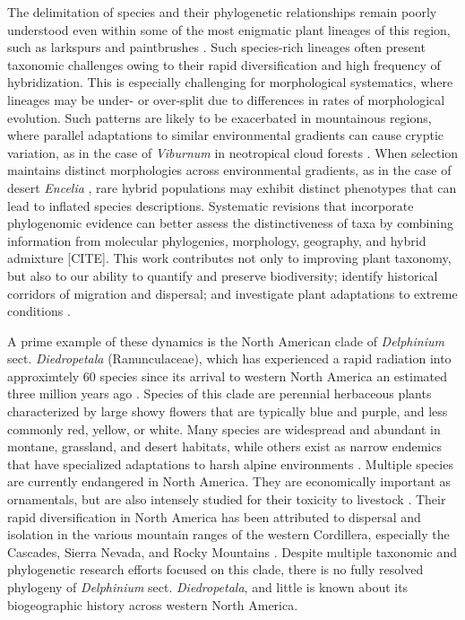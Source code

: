 \documentclass[11pt]{article}
\begin{document}
The delimitation of species and their phylogenetic relationships remain poorly
understood even within some of the most enigmatic plant lineages of this region, 
such as larkspurs \citep{jabbour_phylogeny_2012, xiang_recircumscription_2017} 
and paintbrushes \citep{tank_phylogenetic_2009,jacobs_quantifying_2019}.
% 
Such species-rich lineages often present taxonomic challenges owing to their 
rapid diversification and high frequency of hybridization.
% 
This is especially challenging for morphological systematics, where lineages
may be under- or over-split due to differences in rates of morphological evolution.
% 
Such patterns are likely to be exacerbated in mountainous regions, where
parallel adaptations to similar environmental gradients can cause cryptic variation,
as in the case of \emph{Viburnum} in neotropical
cloud forests \citep{donoghue_replicated_2022}. 
% 
When selection maintains distinct morphologies across environmental
gradients, as in the case of desert \emph{Encelia} 
\citep{divittorio_natural_2020}, rare hybrid populations may exhibit
distinct phenotypes that can lead to inflated species descriptions.
% 
Systematic revisions that incorporate phylogenomic evidence can better
assess the distinctiveness of taxa by combining information from molecular
phylogenies, morphology, geography, and hybrid admixture [CITE].
% 
This work contributes not only to improving plant taxonomy, but also to
our ability to quantify and preserve biodiversity; identify historical 
corridors of migration and dispersal; and investigate plant adaptations
to extreme conditions \citep{anstett_2021, gross_unforeseen_2024, melton_draft_2021}. 


A prime example of these dynamics is the North American clade of \emph{Delphinium} 
sect. \emph{Diedropetala} (Ranunculaceae), which has experienced a rapid radiation 
into approximtely 60 species since its arrival to western North America an 
estimated three million years ago \citep{jabbour_phylogeny_2012}.
% 
Species of this clade are perennial herbaceous plants characterized by large 
showy flowers that are typically blue and purple, and less commonly red, yellow, 
or white. 
% 
Many species are widespread and abundant in montane, grassland, and desert habitats,
while others exist as narrow endemics that have specialized adaptations to harsh 
alpine environments \citep{warnock_taxonomic_1995}. 
% 
Multiple species are currently endangered in North America. 
They are economically important as ornamentals, but are also intensely studied for 
their toxicity to livestock \citep{cook_2009, cook_two_2017, gardner_taxonomic_2002, pfister_grazing_2014}.
Their rapid diversification in North America has been attributed to dispersal and 
isolation in the various mountain ranges of the western Cordillera, especially the
Cascades, Sierra Nevada, and Rocky Mountains \citep{Warnock_1997}.
% 
Despite multiple taxonomic and phylogenetic research efforts focused on this clade,
there is no fully resolved phylogeny of \emph{Delphinium} sect. \emph{Diedropetala},
and little is known about its biogeographic history across western North America.
\end{document}
